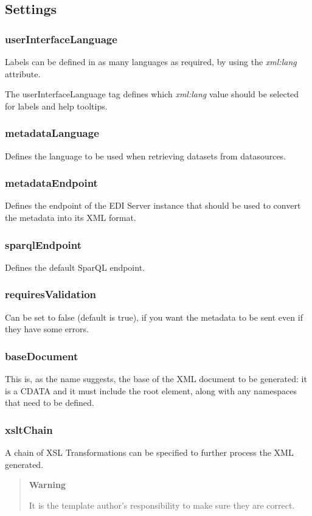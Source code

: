 	\subsection{Settings}

\subsubsection{userInterfaceLanguage}

Labels can be defined in as many languages as required, by using the \textit{xml:lang} attribute.

The userInterfaceLanguage tag defines which \textit{xml:lang} value should be selected for labels and help tooltips.

\subsubsection{metadataLanguage}

Defines the language to be used when retrieving datasets from datasources.

\subsubsection{metadataEndpoint}
Defines the endpoint of the EDI Server instance that should be used to convert the metadata into its XML format.

\subsubsection{sparqlEndpoint}
\label{sparqlEndpoint}
Defines the default SparQL endpoint.

\subsubsection{requiresValidation}
Can be set to false (default is true), if you want the metadata to be sent even if they have some errors.

\subsubsection{baseDocument}
This is, as the name suggests, the base of the XML document to be generated: it is a CDATA and it must include the root element, along with any namespaces that need to be defined.

\subsubsection{xsltChain}
\label{xsltChain}

A chain of XSL Transformations can be specified to further process the XML generated.

\begin{quote}{\textbf{Warning}}
	
	It is the template author's responsibility to make sure they are correct.
\end{quote}

